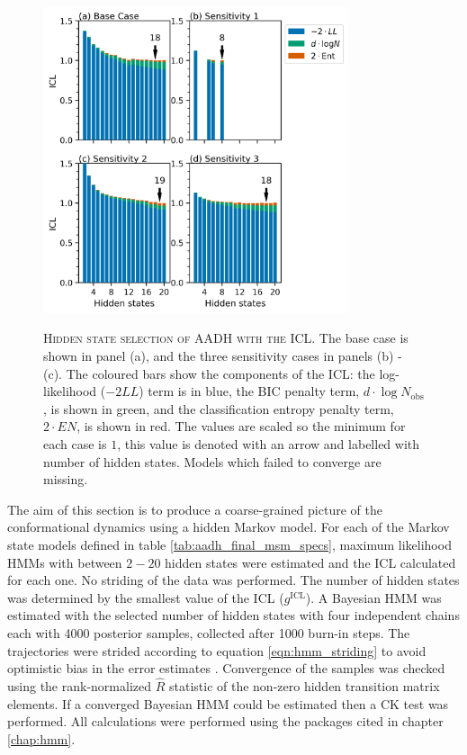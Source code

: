 \begin{figure}
    \centering
    \caption[Hidden state selection of AADH with the ICL]{\textsc{Hidden state selection of AADH with the ICL}. The base case is shown in panel (a), and the three sensitivity cases  in panels (b) - (c).  The coloured bars show the components of the ICL: the log-likelihood ($-2LL$) term is in blue, the BIC penalty term,  $d\cdot\log{N_{\mathrm{obs}}}$, is shown in green, and the classification entropy penalty term, $2\cdot EN$, is shown in red. The values are scaled so the minimum for each case is $1$, this value is denoted with an arrow and labelled  with number of hidden states. Models which failed to converge are missing.}
    \includegraphics[width=0.8\textwidth]{chapters/aadh/figures/aadh_h_state_selection.png}
    \label{fig:aadh_h_selection_results}
\end{figure}

The aim of this section is to produce a coarse-grained picture of the conformational dynamics using a hidden Markov model. For each of the Markov state models defined in table \ref{tab:aadh_final_msm_specs}, maximum likelihood HMMs with between $2 - 20$ hidden states were estimated and the ICL calculated for each one. No striding of the data was performed. The number of hidden states was determined by the smallest value of the ICL ($g^{\mathrm{ICL}}$). A Bayesian HMM was estimated with the selected number of hidden states with four independent chains each with \num{4000} posterior samples, collected after \num{1000} burn-in steps. The trajectories were strided according to equation \ref{eqn:hmm_striding} to avoid optimistic bias in the error estimates \cite{trendelkamp-schroerEstimationUncertaintyReversible2015b}. Convergence of the samples was checked using the rank-normalized $\hat{R}$ statistic \cite{vehtariRanknormalizationFoldingLocalization2020} of the non-zero hidden transition matrix elements. If a converged Bayesian HMM could be estimated then a CK test was performed. All calculations were performed using the packages cited in chapter \ref{chap:hmm}. 

